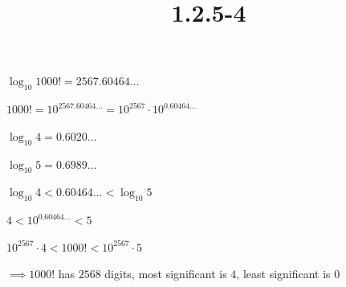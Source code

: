 \documentclass{article}
\title{1.2.5-4}
\begin{document}
\maketitle

\( \log_{10}{1000!} = 2567.60464\ldots \)

\( 1000! = 10^{2567.60464\ldots} = 10^{2567} \cdot 10^{0.60464\ldots} \)

\( \log_{10}{4} = 0.6020\ldots \)

\( \log_{10}{5} = 0.6989\ldots \)

\( \log_{10}{4} < 0.60464\ldots < \log_{10}{5} \)

\( 4 < 10^{0.60464\ldots} < 5 \)

\( 10^{2567} \cdot 4 < 1000! < 10^{2567} \cdot 5 \)

\( \implies 1000! \) has \( 2568 \) digits, most significant is \( 4 \), least significant is \( 0 \)
\end{document}

